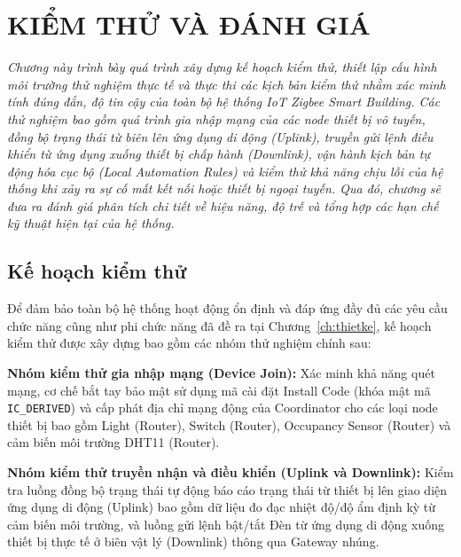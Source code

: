 \chapter{KIỂM THỬ VÀ ĐÁNH GIÁ}
\label{ch:ketqua}

\vspace{0.5cm}
\noindent\textit{Chương này trình bày quá trình xây dựng kế hoạch kiểm
thử, thiết lập cấu hình môi trường thử nghiệm thực tế và thực thi các
kịch bản kiểm thử nhằm xác minh tính đúng đắn, độ tin cậy của toàn bộ
hệ thống IoT Zigbee Smart Building. Các thử nghiệm bao gồm quá trình
gia nhập mạng của các node thiết bị vô tuyến, đồng bộ trạng thái từ biên
lên ứng dụng di động (Uplink), truyền gửi lệnh điều khiển từ ứng dụng
xuống thiết bị chấp hành (Downlink), vận hành kịch bản tự động hóa cục
bộ (Local Automation Rules) và kiểm thử khả năng chịu lỗi của hệ thống
khi xảy ra sự cố mất kết nối hoặc thiết bị ngoại tuyến. Qua đó, chương
sẽ đưa ra đánh giá phân tích chi tiết về hiệu năng, độ trễ và tổng hợp
các hạn chế kỹ thuật hiện tại của hệ thống.}
\vspace{0.5cm}

\section{Kế hoạch kiểm thử}
\label{sec:ch5-test-plan}

Để đảm bảo toàn bộ hệ thống hoạt động ổn định và đáp ứng đầy đủ các yêu
cầu chức năng cũng như phi chức năng đã đề ra tại Chương~\ref{ch:thietke}, kế hoạch
kiểm thử được xây dựng bao gồm các nhóm thử nghiệm chính sau:

\textbf{Nhóm kiểm thử gia nhập mạng (Device Join):} Xác minh khả năng quét mạng, cơ chế bắt tay bảo mật sử dụng mã cài đặt Install Code (khóa mật mã \texttt{IC\_DERIVED}) và cấp phát địa chỉ mạng động của Coordinator cho các loại node thiết bị bao gồm Light (Router), Switch (Router), Occupancy Sensor (Router) và cảm biến môi trường DHT11 (Router).

\textbf{Nhóm kiểm thử truyền nhận và điều khiển (Uplink và Downlink):} Kiểm tra luồng đồng bộ trạng thái tự động báo cáo trạng thái từ thiết bị lên giao diện ứng dụng di động (Uplink) bao gồm dữ liệu đo đạc nhiệt độ/độ ẩm định kỳ từ cảm biến môi trường, và luồng gửi lệnh bật/tắt Đèn từ ứng dụng di động xuống thiết bị thực tế ở biên vật lý (Downlink) thông qua Gateway nhúng.

